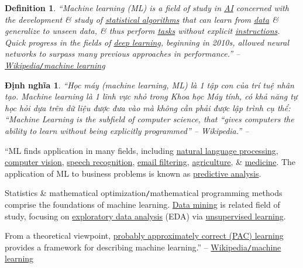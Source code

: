 \documentclass{article}
\newtheorem{definition}{Definition}
\newtheorem{dinhnghia}{Định nghĩa}
\begin{document}
\begin{definition}
	``\emph{Machine learning (ML)} is a field of study in \href{https://en.wikipedia.org/wiki/Artificial_intelligence}{AI} concerned with the development \& study of \href{https://en.wikipedia.org/wiki/Computational_statistics}{statistical algorithms} that can learn from \href{https://en.wikipedia.org/wiki/Data}{data} \& generalize to unseen data, \& thus perform \href{https://en.wikipedia.org/wiki/Task_(computing)}{tasks} without explicit \href{https://en.wikipedia.org/wiki/Machine_code}{instructions}. Quick progress in the fields of \href{https://en.wikipedia.org/wiki/Deep_learning}{deep learning}, beginning in 2010s, allowed neural networks to surpass many previous approaches in performance.'' -- \href{https://en.wikipedia.org/wiki/Machine_learning}{Wikipedia{\tt/}machine learning}
\end{definition}

\begin{dinhnghia}
	``\emph{Học máy} (machine learning, ML) là 1 tập con của trí tuệ nhân tạo. Machine learning là 1 lĩnh vực nhỏ trong Khoa học Máy tính, có khả năng tự học hỏi dựa trên dữ liệu được đưa vào mà không cần phải được lập trình cụ thể: ``Machine Learning is the subfield of computer science, that ``gives computers the ability to learn without being explicitly programmed'' -- Wikipedia.'' -- \cite[p. 15]{Tiep_ML_co_ban}
\end{dinhnghia}
``ML finds application in many fields, including \href{https://en.wikipedia.org/wiki/Natural_language_processing}{natural language processing}, \href{https://en.wikipedia.org/wiki/Computer_vision}{computer vision}, \href{https://en.wikipedia.org/wiki/Speech_recognition}{speech recognition}, \href{https://en.wikipedia.org/wiki/Email_filtering}{email filtering}, \href{https://en.wikipedia.org/wiki/Agriculture}{agriculture}, \& \href{https://en.wikipedia.org/wiki/Medicine}{medicine}. The application of ML to business problems is known as \href{https://en.wikipedia.org/wiki/Predictive_analytics}{predictive analysis}.

Statistics \& mathematical optimization{\tt/}mathematical programming methods comprise the foundations of machine learning. \href{https://en.wikipedia.org/wiki/Data_mining}{Data mining} is related field of study, focusing on \href{https://en.wikipedia.org/wiki/Exploratory_data_analysis}{exploratory data analysis} (EDA) via \href{https://en.wikipedia.org/wiki/Unsupervised_learning}{unsupervised learning}.

From a theoretical viewpoint, \href{https://en.wikipedia.org/wiki/Probably_approximately_correct_learning}{probably approximately correct (PAC) learning} provides a framework for describing machine learning.'' -- \href{https://en.wikipedia.org/wiki/Machine_learning}{Wikipedia{\tt/}machine learning}
\end{document}
